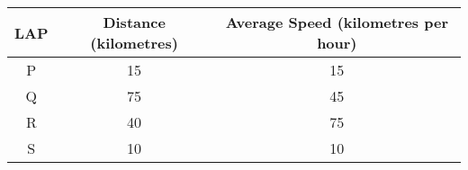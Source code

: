 \begin{table}[h!]
    \centering
    \begin{tabular}{|c|c|c|}
        \hline
        \textbf{LAP} & \textbf{Distance} (kilometres) & \textbf{Average Speed} (kilometres per hour) \\
        \hline
        P & 15 & 15 \\
        \hline
        Q & 75 & 45 \\
        \hline
        R & 40 & 75 \\
        \hline
        S & 10 & 10 \\
        \hline
    \end{tabular}
\end{table}
